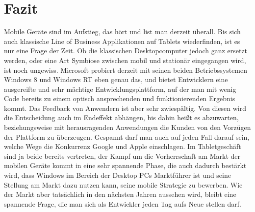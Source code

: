\documentclass[a4paper,bibtotoc,oneside]{scrbook}
\begin{document}
\chapter[Fazit]{Fazit}
Mobile Geräte sind im Aufstieg, das hört und list man derzeit überall. Bis sich auch klassische Line of Business Applikationen auf Tablets wiederfinden, ist es nur eine Frage der Zeit. Ob die klassischen Desktopcomputer jedoch ganz ersetzt werden, oder eine Art Symbiose zwischen mobil und stationär eingegangen wird, ist noch ungewiss.
\newline
\newline
Microsoft probiert derzeit mit seinen beiden Betriebssystemen Windows 8 und Windows RT eben genau das, und bietet Entwicklern eine ausgereifte und sehr mächtige Entwicklungsplattform, auf der man mit wenig Code bereits zu einem optisch ansprechenden und funktionierenden Ergebnis kommt. Das Feedback von Anwendern ist aber sehr zwiespältig.
\newline
\newline
Von diesen wird die Entscheidung auch im Endeffekt abhängen, bis dahin heißt es abzuwarten, beziehungsweise mit herausragenden Anwendungen die Kunden von den Vorzügen der Plattform zu überzeugen.
\newline
\newline
Gespannt darf man auch auf jeden Fall darauf sein, welche Wege die Konkurrenz Google und Apple einschlagen. Im Tabletgeschäft sind ja beide bereits vertreten, der Kampf um die Vorherrschaft am Markt der mobilen Geräte kommt in eine sehr spannende Phase, die auch dadurch bestärkt wird, dass Windows im Bereich der Desktop PCs Marktführer ist und seine Stellung am Markt dazu nutzen kann, seine mobile Strategie zu bewerben.
\newline
\newline
Wie der Markt aber tatsächlich in den nächsten Jahren aussehen wird, bleibt eine spannende Frage, die man sich als Entwickler jeden Tag aufs Neue stellen darf.




\end{document}
